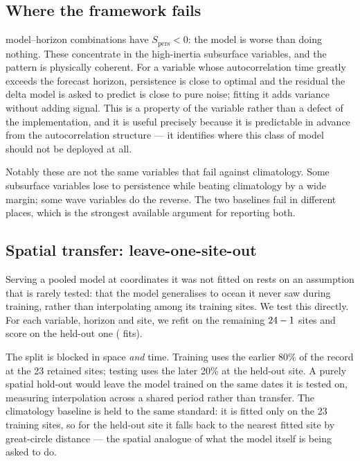 \begin{table}[tb]
\centering
\caption{Skill against persistence under each feature arm at \SI{30}{\day},
with skill against climatology for reference. Bold marks the cases where
removing the calendar destroys more than half the skill --- the genuinely
seasonal ones, which are a minority and are mostly \emph{not} the ones that
lose to climatology.}
\label{tab:ablation}
\tabscale

\end{table}

\subsection{Where the framework fails}

\NLoseToPers{} model--horizon combinations have $S_{\mathrm{pers}} < 0$: the
model is worse than doing nothing. These concentrate in the high-inertia
subsurface variables, and the pattern is physically coherent. For a variable
whose autocorrelation time greatly exceeds the forecast horizon, persistence is
close to optimal and the residual the delta model is asked to predict is close
to pure noise; fitting it adds variance without adding signal. This is a
property of the variable rather than a defect of the implementation, and it is
useful precisely because it is predictable in advance from the autocorrelation
structure --- it identifies where this class of model should not be deployed at
all.

Notably these are not the same variables that fail against climatology. Some
subsurface variables lose to persistence while beating climatology by a wide
margin; some wave variables do the reverse. The two baselines fail in different
places, which is the strongest available argument for reporting both.

\subsection{Spatial transfer: leave-one-site-out}
\label{sec:loso}

Serving a pooled model at coordinates it was not fitted on rests on an
assumption that is rarely tested: that the model generalises to ocean it never
saw during training, rather than interpolating among its training sites. We
test this directly. For each variable, horizon and site, we refit on the remaining
\(24 - 1\) sites and score on the held-out one (\NLosoFits{} fits).

The split is blocked in space \emph{and} time. Training uses the earlier 80\%
of the record at the 23 retained sites; testing uses the later 20\% at the
held-out site. A purely spatial hold-out would leave the model trained on the
same dates it is tested on, measuring interpolation across a shared period
rather than transfer. The climatology baseline is held to the same standard: it
is fitted only on the 23 training sites, so for the held-out site it falls back
to the nearest fitted site by great-circle distance --- the spatial analogue of
what the model itself is being asked to do.

